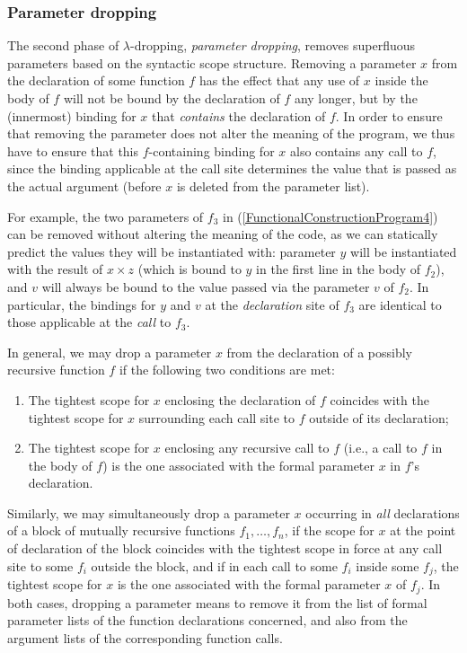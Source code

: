 {\subsubsection{Parameter dropping}
\label{section:Part1:Semantics:lambdaDropping:parameterDropping}
The second phase of $\lambda$-dropping, \emph{parameter 
dropping},
removes superfluous parameters based on the syntactic scope structure.
Removing a parameter $x$ from the declaration of some function $f$ has
the effect that any use of $x$ inside the body of $f$ will not be
bound by the declaration of $f$ any longer, but by the (innermost)
binding for $x$ that \emph{contains} the declaration of $f$. In order
to ensure that removing the parameter does not alter the meaning of
the program, we thus have to ensure that this $f$\!-containing binding
for $x$ also contains any call to $f$, since the binding applicable at
the call site determines the value that is passed as the actual
argument (before $x$ is deleted from the parameter list).  

For example, the two parameters of $f_3$ in
(\ref{FunctionalConstructionProgram4}) can be removed without altering
the meaning of the code, as we can statically predict the values they
will be instantiated with: parameter $y$ will be instantiated with the
result of $x\times z$ (which is bound to $y$ in the first line in the body
of $f_2$), and $v$ will always be bound to the value passed via the
parameter $v$ of $f_2$. In particular, the bindings for $y$ and $v$ at
the \emph{declaration} site of $f_3$ are identical to those applicable
at the \emph{call} to $f_3$.

In general, we may drop a parameter $x$ from the declaration of a
possibly recursive function $f$ if the following two conditions are met:
\begin{enumerate}
\item\label{ParameterDroppingConditionOne} The tightest scope for $x$
  enclosing the declaration of $f$\! coincides with the tightest scope
  for $x$ surrounding each call site to $f$\! outside of its declaration;
\item\label{ParameterDroppingConditionTwo} The tightest scope for $x$
  enclosing any recursive call to $f$ (i.e., a call to $f$ in the body
  of $f$) is the one associated with the formal parameter $x$ in $f$'s
  declaration.
\end{enumerate}

Similarly, we may simultaneously drop a parameter $x$ occurring in
\emph{all} declarations of a block of mutually recursive functions
$f_1,\ldots,f_n$, if the scope for $x$ at the point of declaration of
the block coincides with the tightest scope in force at any call site
to some $f_i$ outside the block, and if in each call to some $f_i$
inside some $f_j$, the tightest scope for $x$ is the one associated
with the formal parameter $x$ of $f_j$. In both cases, dropping a
parameter means to remove it from the list of formal parameter lists
of the function declarations concerned, and also from the argument
lists of the corresponding function calls.

}
